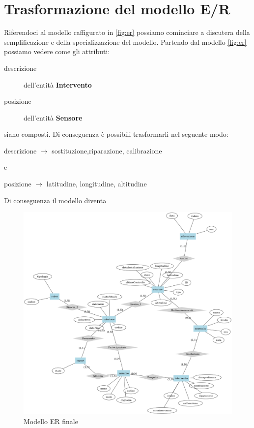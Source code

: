 \section{Trasformazione del modello E/R}
Riferendoci al modello raffigurato in \ref{fig:er} possiamo cominciare
a discutera della semplificazione e della specializzazione del
modello. Partendo dal modello \ref{fig:er} possiamo vedere come gli attributi:
\begin{description}
\item[descrizione] dell'entità \textbf{Intervento}
\item[posizione] dell'entità \textbf{Sensore}
\end{description}
siano composti. Di conseguenza è possibili trasformarli nel seguente modo:
\begin{center}
  descrizione $\rightarrow$ sostituzione,riparazione, calibrazione
\end{center}
e
\begin{center}
  posizione $\rightarrow$ latitudine, longitudine, altitudine
\end{center}

Di conseguenza il modello diventa
\begin{figure}[ht]
  \includegraphics[width=\linewidth]{images/er-finale.png}
  \caption{Modello ER finale}
  \label{fig:er-finale}
\end{figure}
 	

